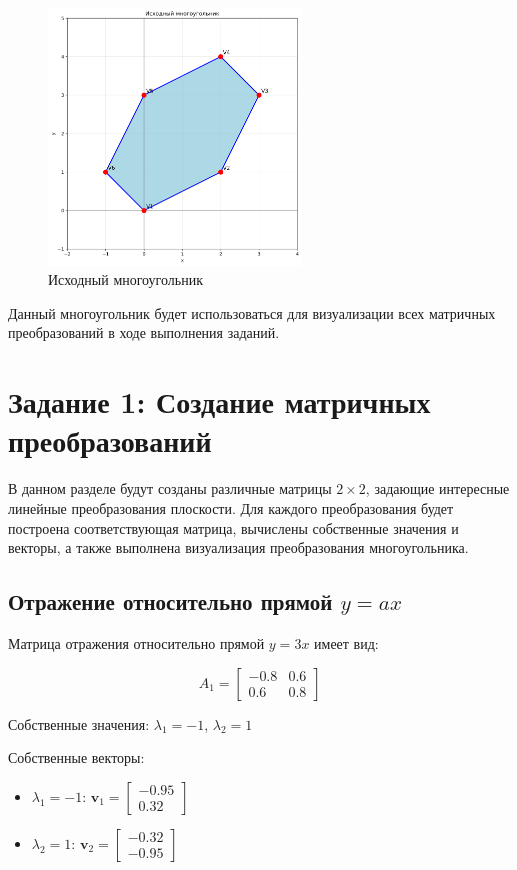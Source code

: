 \begin{figure}[h]
\centering
\includegraphics[width=0.6\textwidth]{images/original_polygon.png}
\caption{Исходный многоугольник}
\label{fig:original_polygon}
\end{figure}

Данный многоугольник будет использоваться для визуализации всех матричных преобразований в ходе выполнения заданий.

\section*{Задание 1: Создание матричных преобразований}

В данном разделе будут созданы различные матрицы $2 \times 2$, задающие интересные линейные преобразования плоскости. Для каждого преобразования будет построена соответствующая матрица, вычислены собственные значения и векторы, а также выполнена визуализация преобразования многоугольника.

\subsection*{Отражение относительно прямой $y = ax$}

Матрица отражения относительно прямой $y = 3x$ имеет вид:

\begin{equation}
A_1 = \begin{bmatrix} -0.8 & 0.6 \\ 0.6 & 0.8 \end{bmatrix}
\end{equation}

Собственные значения: $\lambda_1 = -1$, $\lambda_2 = 1$

Собственные векторы:
\begin{itemize}
\item $\lambda_1 = -1$: $\mathbf{v}_1 = \begin{bmatrix} -0.95 \\ 0.32 \end{bmatrix}$
\item $\lambda_2 = 1$: $\mathbf{v}_2 = \begin{bmatrix} -0.32 \\ -0.95 \end{bmatrix}$
\end{itemize}

